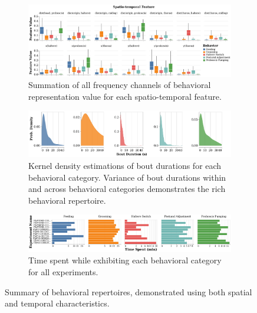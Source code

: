 \begin{figure}[h!]
	\centering
	\begin{subfigure}[b]{0.95\linewidth}
		\centering
		\includegraphics[width=\linewidth]{figures/FeatureDistributions_perBehavior-Ann.pdf}
		\caption{Summation of all frequency channels of behavioral representation value for each spatio-temporal feature.\label{figure:feature-distributions}}
	\end{subfigure}%

	\centering
	\begin{subfigure}[b]{0.95\linewidth}
		\centering
		\includegraphics[width=\linewidth]{figures/BoutDurationDistributions-Ann.pdf}
		\caption{Kernel density estimations of bout durations for each behavioral category. Variance of bout durations within and across behavioral categories demonstrates the rich behavioral repertoire. \label{figure:bout-durations}}
	\end{subfigure}%

	\centering
	\begin{subfigure}[htb!]{0.95\linewidth}
		\centering
		\includegraphics[width=\linewidth]{figures/TimeSpent-perBehavior-Ann.pdf}
		\caption{Time spent while exhibiting each behavioral category for all experiments. \label{figure:time-spent-in-behaviors}}
	\end{subfigure}%
	\caption{Summary of behavioral repertoires, demonstrated using both spatial and temporal characteristics. \label{figure:summary-behavior-characteristics}}
\end{figure}

